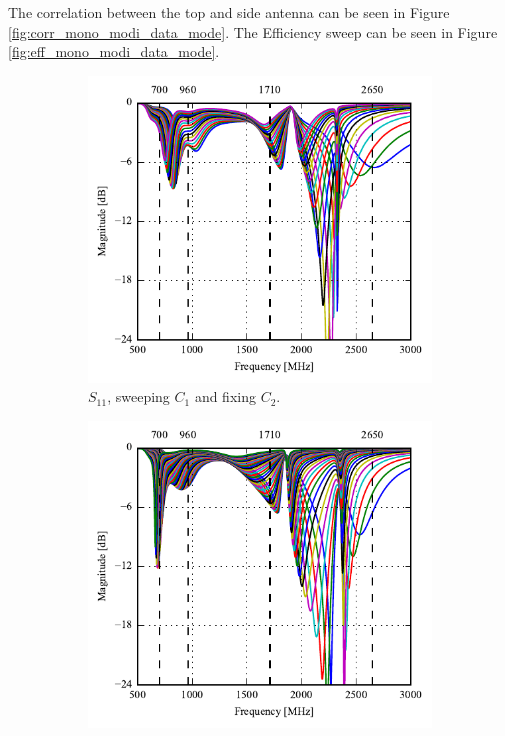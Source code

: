 The correlation between the top and side antenna can be seen in Figure \ref{fig:corr_mono_modi_data_mode}.
The Efficiency sweep can be seen in Figure \ref{fig:eff_mono_modi_data_mode}. 
\begin{figure}[htbp]
   \begin{subfigure}[b]{0.49\linewidth}
        \centering
        \includegraphics{img/tech_sol/monopole/highband/ue/datamode/s11.pdf}
        \caption{$S_{11}$, sweeping $C_1$ and fixing $C_2$.}
    \end{subfigure}
    \hfill
    \begin{subfigure}[b]{0.49\linewidth}
        \centering
        \includegraphics{img/tech_sol/monopole/highband/ue/datamode/s22.pdf}

\end{subfigure}
\end{figure}
